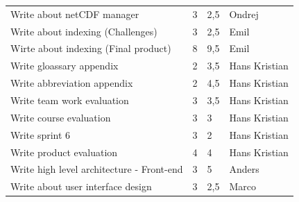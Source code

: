 \documentclass[11pt,a4paper,titlepage,oneside]{report}
\begin{document}
\begin{table}[h]
{\begin{tabular}{llll}
Write about netCDF manager                             & 3                                                                   & 2,5                                                     & Ondrej                     \\
Write about indexing (Challenges)                      & 3                                                                   & 2,5                                                     & Emil                       \\
Wirte about indexing (Final product)                   & 8                                                                   & 9,5                                                     & Emil                       \\
Write gloassary appendix                               & 2                                                                   & 3,5                                                     & Hans Kristian              \\
Write abbreviation appendix                            & 2                                                                   & 4,5                                                     & Hans Kristian              \\
Write team work evaluation                             & 3                                                                   & 3,5                                                     & Hans Kristian              \\
Write course evaluation                                & 3                                                                   & 3                                                       & Hans Kristian              \\
Write sprint 6                                         & 3                                                                   & 2                                                       & Hans Kristian              \\
Write product evaluation                               & 4                                                                   & 4                                                       & Hans Kristian              \\
Write high level architecture - Front-end              & 3                                                                   & 5                                                       & Anders                     \\
Write about user interface design                      & 3                                                                   & 2,5                                                     & Marco                      \\

\end{tabular}}
\end{table}
\end{document}
